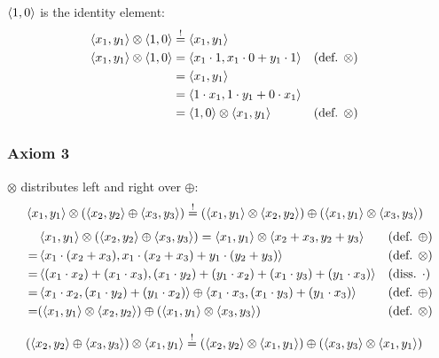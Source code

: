 \documentclass[a4paper,12pt]{ETHexercise}
\begin{document}
$\left\langle1, 0\right\rangle$ is the identity element:
\begin{align}
    \left\langle x_1, y_1\right\rangle \otimes \left\langle1, 0\right\rangle &\stackrel{!}{=} \left\langle x_1, y_1\right\rangle\\
    \left\langle x_1, y_1\right\rangle \otimes \left\langle1, 0\right\rangle &= \left\langle x_1 \cdot 1, x_1 \cdot 0 + y_1 \cdot 1\right\rangle &&(\text{def. } \otimes)\\
    &= \left\langle x_1, y_1\right\rangle\\
    &= \left\langle1 \cdot x_1, 1 \cdot y_1 + 0 \cdot x_1\right\rangle\\
    &= \left\langle1, 0\right\rangle \otimes \left\langle x_1, y_1\right\rangle &&(\text{def. } \otimes)
\end{align}

\subsubsection*{Axiom 3}
$\otimes$ distributes left and right over $\oplus$:
\begin{align}
        &\left\langle x_1, y_1\right\rangle \otimes (\left\langle x_2, y_2\right\rangle \oplus \left\langle x_3, y_3\right\rangle) \stackrel{!}{=} (\left\langle x_1, y_1\right\rangle \otimes \left\langle x_2, y_2\right\rangle) \oplus (\left\langle x_1, y_1\right\rangle \otimes\left\langle x_3, y_3\right\rangle)
\end{align}
\begin{align}
    &\left\langle x_1, y_1\right\rangle \otimes (\left\langle x_2, y_2\right\rangle \oplus \left\langle x_3, y_3\right\rangle) = \left\langle x_1, y_1\right\rangle \otimes \left\langle x_2 + x_3, y_2 + y_3\right\rangle &&(\text{def. }\oplus)\\
    = &\left\langle x_1 \cdot (x_2 + x_3), x_1 \cdot (x_2 + x_3) + y_1 \cdot (y_2 + y_3)\right\rangle &&(\text{def. }\otimes)\\
    = &\left\langle(x_1 \cdot x_2) + (x_1 \cdot x_3),  (x_1 \cdot y_2) + (y_1 \cdot x_2) + (x_1 \cdot y_3)  + (y_1 \cdot x_3)\right\rangle &&(\text{diss. }\cdot)\\
    = &\left\langle x_1 \cdot x_2, (x_1 \cdot y_2) + (y_1 \cdot x_2)\right\rangle \oplus \left\langle x_1 \cdot x_3, (x_1 \cdot y_3)  + (y_1 \cdot x_3)\right\rangle &&(\text{def. }\oplus)\\
    =   &(\left\langle x_1, y_1\right\rangle \otimes \left\langle x_2, y_2\right\rangle) \oplus (\left\langle x_1, y_1\right\rangle \otimes \left\langle x_3, y_3\right\rangle) &&(\text{def. }\otimes)
\end{align}

\begin{align}
        &(\left\langle x_2, y_2\right\rangle \oplus \left\langle x_3, y_3\right\rangle) \otimes \left\langle x_1, y_1\right\rangle \stackrel{!}{=} (\left\langle x_2, y_2\right\rangle \otimes \left\langle x_1, y_1\right\rangle) \oplus (\left\langle x_3, y_3\right\rangle \otimes \left\langle x_1, y_1\right\rangle)
\end{align}
\end{document}
